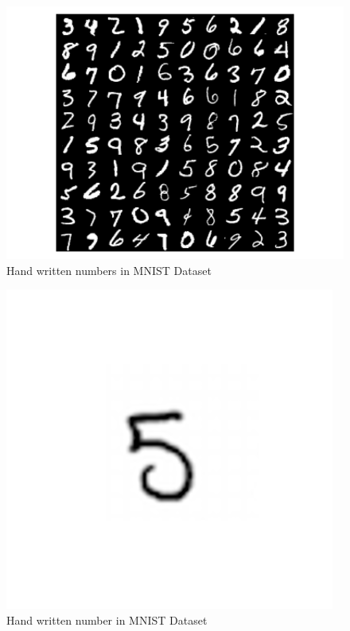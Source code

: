 \begin{figure}[!ht]
        \centering\includegraphics[width=\columnwidth]
        {images/mnist-digits-small.png}
        \caption{Hand written numbers in MNIST Dataset}\label{s:MNIST-digits-small}
\end{figure}

\begin{figure}[!ht]
        \centering\includegraphics[width=\columnwidth]
        {images/mnist-digit-big.png}
        \caption{Hand written number in MNIST Dataset}\label{s:MNIST-digit}
\end{figure}

